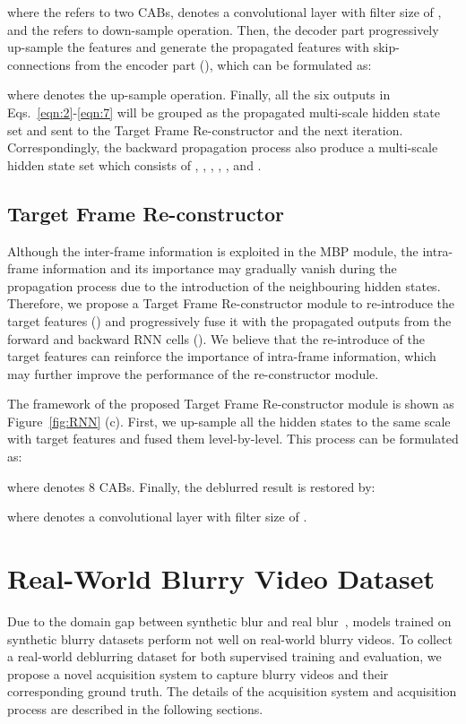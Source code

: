 \documentclass[letterpaper]{article} \usepackage{aaai22}  \usepackage{times}  \usepackage{helvet}  \usepackage{courier}  \usepackage[hyphens]{url}  \usepackage{graphicx} \urlstyle{rm} \def\UrlFont{\rm}  \usepackage{natbib}  \usepackage{caption} \DeclareCaptionStyle{ruled}{labelfont=normalfont,labelsep=colon,strut=off} \frenchspacing  \setlength{\pdfpagewidth}{8.5in}  \setlength{\pdfpageheight}{11in}  \newcommand{\hang}{\textcolor[rgb]{0.98,0.5,0.04}}
\begin{document}
where the  refers to two CABs,  denotes a convolutional layer with filter size of , and the  refers to down-sample operation.
Then, the decoder part progressively up-sample the features  and generate the propagated features with skip-connections from the encoder part (),
which can be formulated as:



where  denotes the up-sample operation.
Finally, all the six outputs in Eqs.~\eqref{eqn:2}-\eqref{eqn:7} will be grouped as the propagated multi-scale hidden state set  and sent to the Target Frame Re-constructor and the next iteration.
Correspondingly, the backward propagation process also produce a multi-scale hidden state set  which consists of , , , , , and .


\subsection{Target Frame Re-constructor}
\vspace{-1mm}
Although the inter-frame information is exploited in the MBP module, 
the intra-frame information and its importance may gradually vanish during the propagation process due to the introduction of the neighbouring hidden states.
Therefore, we propose a Target Frame Re-constructor module to re-introduce the target features () and progressively fuse it with the propagated outputs from the forward and backward RNN cells ().
We believe that the re-introduce of the target features can reinforce the importance of intra-frame information, which may further improve the performance of the re-constructor module.

The framework of the proposed Target Frame Re-constructor module is shown as Figure~\ref{fig:RNN} (c).
First, we up-sample all the hidden states to the same scale with target features and fused them level-by-level.
This process can be formulated as:



where  denotes 8 CABs.
Finally, the deblurred result  is restored by:

where  denotes a convolutional layer with filter size of .


\section{Real-World Blurry Video Dataset}
\vspace{-0.5mm}
Due to the domain gap between synthetic blur and real blur~\cite{8953368}, models trained on synthetic blurry datasets perform not well on real-world blurry videos.
To collect a real-world deblurring dataset for both supervised training and evaluation, we propose a novel acquisition system to capture blurry videos and their corresponding ground truth.
The details of the acquisition system and acquisition process are described in the following sections.
\end{document}
